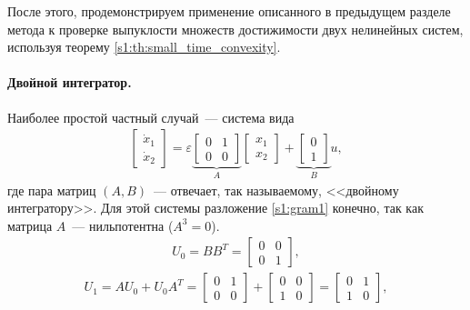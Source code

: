 \documentclass[../main.tex]{subfiles}
\begin{document}
После этого, продемонстрируем применение описанного в предыдущем разделе метода к проверке выпуклости множеств достижимости двух нелинейных систем, используя теорему \ref{s1:th:small_time_convexity}.

\paragraph{Двойной интегратор.}
Наиболее простой частный случай~--- система вида 
\begin{gather*}
 \left[ {\begin{array}{*{20}{c}}
 {{{\dot x}_1}}\\
 {{{\dot x}_2}}
 \end{array}} \right] = \varepsilon \underbrace {\left[ {\begin{array}{*{20}{c}}
 0&1\\
 0&0
 \end{array}} \right]}_A\left[ {\begin{array}{*{20}{c}}
 {{x_1}}\\
 {{x_2}}
 \end{array}} \right] + \underbrace {\left[ {\begin{array}{*{20}{c}}
 0\\
 1
 \end{array}} \right]}_Bu,
\end{gather*}
где пара матриц $ (A,B) $~--- отвечает, так называемому, <<двойному интегратору>>.
Для этой системы разложение \eqref{s1:gram1} конечно, так как матрица $ A $~--- нильпотентна ($ A^3 = 0$).
\begin{gather*}
 U_0 = B B^T = \left[ {\begin{array}{*{20}{c}}
 0&0\\
 0&1
 \end{array}}\right],
\end{gather*}
\begin{gather*}
 U_1 = A U_0 + U_0 A^T = \left[ {\begin{array}{*{20}{c}}
 0&1\\
 0&0
 \end{array}}\right] + \left[ {\begin{array}{*{20}{c}}
 0&0\\
 1&0
 \end{array}}\right] = \left[ {\begin{array}{*{20}{c}}
 0&1\\
 1&0
 \end{array}}\right],
\end{gather*}
\end{document}
